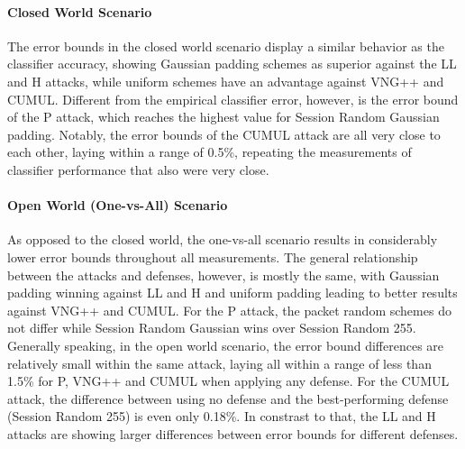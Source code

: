 \documentclass[
	ruledheaders=chapter,
	class=report,
	thesis={type=master, department=inf},
	accentcolor=1c,
	custommargins=true,
	marginpar=false,
	parskip=half-,
	fontsize=11pt,
]{tudapub}
\begin{document}
	\paragraph{Closed World Scenario} The error bounds in the closed world scenario display a similar behavior as the classifier accuracy, showing Gaussian padding schemes as superior against the LL and H attacks, while uniform schemes have an advantage against VNG++ and CUMUL. Different from the empirical classifier error, however, is the error bound of the P attack, which reaches the highest value for Session Random Gaussian padding. Notably, the error bounds of the CUMUL attack are all very close to each other, laying within a range of 0.5\%, repeating the measurements of classifier performance that also were very close.
	
	\paragraph{Open World (One-vs-All) Scenario} As opposed to the closed world, the one-vs-all scenario results in considerably lower error bounds throughout all measurements. The general relationship between the attacks and defenses, however, is mostly the same, with Gaussian padding winning against LL and H and uniform padding leading to better results against VNG++ and CUMUL. For the P attack, the packet random schemes do not differ while Session Random Gaussian wins over Session Random 255. Generally speaking, in the open world scenario, the error bound differences are relatively small within the same attack, laying all within a range of less than 1.5\% for P, VNG++ and CUMUL when applying any defense. For the CUMUL attack, the difference between using no defense and the best-performing defense (Session Random 255) is even only 0.18\%. In constrast to that, the LL and H attacks are showing larger differences between error bounds for different defenses.
\end{document}

